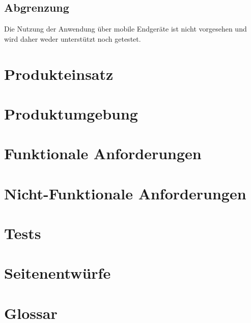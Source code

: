 \documentclass[parskip=full,11pt,twoside]{scrartcl}
\begin{document}


\subsection{Abgrenzung}

Die Nutzung der Anwendung über mobile Endgeräte ist nicht vorgesehen und wird daher weder unterstützt noch getestet.

\pagebreak
\section{Produkteinsatz}

\section{Produktumgebung}

\section{Funktionale Anforderungen}


\section{Nicht-Funktionale Anforderungen}


\section{Tests}

%
%
%

\pagebreak
\appendix

\section{Seitenentwürfe}


\section{Glossar}

\printglossaries
\end{document}
